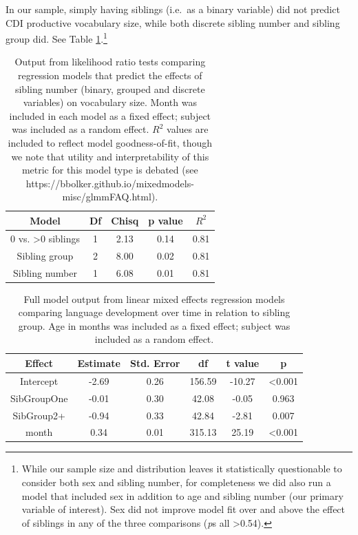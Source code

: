 \documentclass[
  man,mask,floatsintext]{apa6}
\begin{document}
In our sample, simply having siblings (i.e.~as a binary variable) did not predict CDI productive vocabulary size, while both discrete sibling number and sibling group did. See Table \ref{tab:table-sibling-model-output}.\footnote{While our sample size and distribution leaves it statistically questionable to consider both sex and sibling number, for completeness we did also run a model that included sex in addition to age and sibling number (our primary variable of interest). Sex did not improve model fit over and above the effect of siblings in any of the three comparisons (\emph{p}s all \textgreater0.54).}

\begin{longtable}[t]{ccccc}
\caption{\label{tab:table-sibling-model-output}Output from likelihood ratio tests comparing regression models that predict the effects of sibling number (binary, grouped and discrete variables) on vocabulary size. Month was included in each model as a fixed effect; subject was included as a random effect. $R^{2}$ values are included to reflect model goodness-of-fit, though we note that utility and interpretability of this metric for this model type is debated (see https://bbolker.github.io/mixedmodels-misc/glmmFAQ.html).}\\
\toprule
Model & Df & Chisq & p value & $R^{2}$\\
\midrule
0 vs. >0 siblings & 1 & 2.13 & 0.14 & 0.81\\
Sibling group & 2 & 8.00 & 0.02 & 0.81\\
Sibling number & 1 & 6.08 & 0.01 & 0.81\\
\bottomrule
\end{longtable}

\newpage

\begin{longtable}[t]{cccccc}
\caption{\label{tab:table-sibgroup-model-summary}Full model output from linear mixed effects regression models comparing language development over time in relation to sibling group. Age in months was included as a fixed effect; subject was included as a random effect.}\\
\toprule
Effect & Estimate & Std. Error & df & t value & p\\
\midrule
Intercept & -2.69 & 0.26 & 156.59 & -10.27 & <0.001\\
SibGroupOne & -0.01 & 0.30 & 42.08 & -0.05 & 0.963\\
SibGroup2+ & -0.94 & 0.33 & 42.84 & -2.81 & 0.007\\
month & 0.34 & 0.01 & 315.13 & 25.19 & <0.001\\
\bottomrule
\end{longtable}
\end{document}
